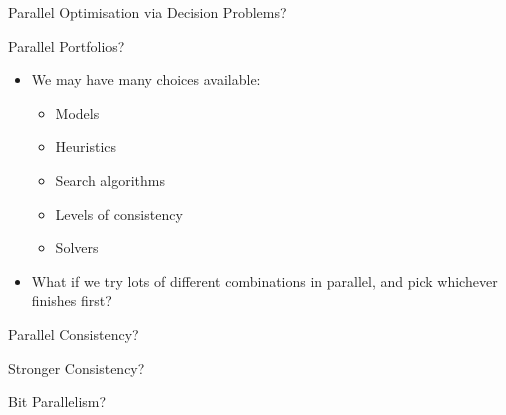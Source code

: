 \documentclass{beamer}
\begin{document}
\begin{frame}{Parallel Optimisation via Decision Problems?}
{\begin{center}
        \end{center}
    }

\end{frame}

\begin{frame}{Parallel Portfolios?}
    \begin{itemize}
        \item We may have many choices available:
            \begin{itemize}
                \item Models
                \item Heuristics
                \item Search algorithms
                \item Levels of consistency
                \item Solvers
            \end{itemize}

        \item What if we try lots of different combinations in parallel, and pick whichever finishes
            first?
    \end{itemize}
\end{frame}

\begin{frame}{Parallel Consistency?}
\end{frame}

\begin{frame}{Stronger Consistency?}
\end{frame}

\begin{frame}{Bit Parallelism?}
\end{frame}
\end{document}
